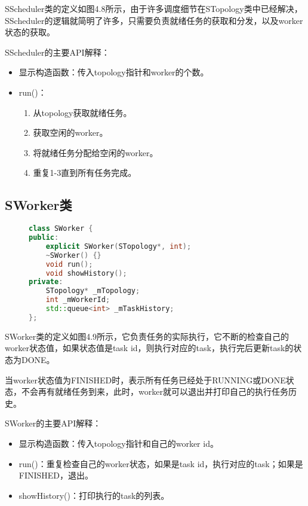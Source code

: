 SScheduler类的定义如图4.8所示，由于许多调度细节在STopology类中已经解决，SScheduler的逻辑就简明了许多，只需要负责就绪任务的获取和分发，以及worker状态的获取。

SScheduler的主要API解释：

\begin{itemize}
	\item 显示构造函数：传入topology指针和worker的个数。
	\item run()：
	\begin{enumerate}
		\item 从topology获取就绪任务。
		\item 获取空闲的worker。
		\item 将就绪任务分配给空闲的worker。
		\item 重复1-3直到所有任务完成。
	\end{enumerate}
\end{itemize}

\subsection{SWorker类}

\begin{figure}[!htbp]
    \centering
\begin{lstlisting}[language=c++,caption={}]
class SWorker {
public:
    explicit SWorker(STopology*, int);
    ~SWorker() {}
    void run();
    void showHistory();
private:
    STopology* _mTopology;
    int _mWorkerId;
    std::queue<int> _mTaskHistory;
};
\end{lstlisting}
    \label{fig:4_sworker}
\end{figure}

SWorker类的定义如图4.9所示，它负责任务的实际执行，它不断的检查自己的worker状态值，如果状态值是task id，则执行对应的task，执行完后更新task的状态为DONE。

当worker状态值为FINISHED时，表示所有任务已经处于RUNNING或DONE状态，不会再有就绪任务到来，此时，worker就可以退出并打印自己的执行任务历史。

SWorker的主要API解释：

\begin{itemize}
	\item 显示构造函数：传入topology指针和自己的worker id。
	\item run()：重复检查自己的worker状态，如果是task id，执行对应的task；如果是FINISHED，退出。
	\item showHistory()：打印执行的task的列表。
\end{itemize}

